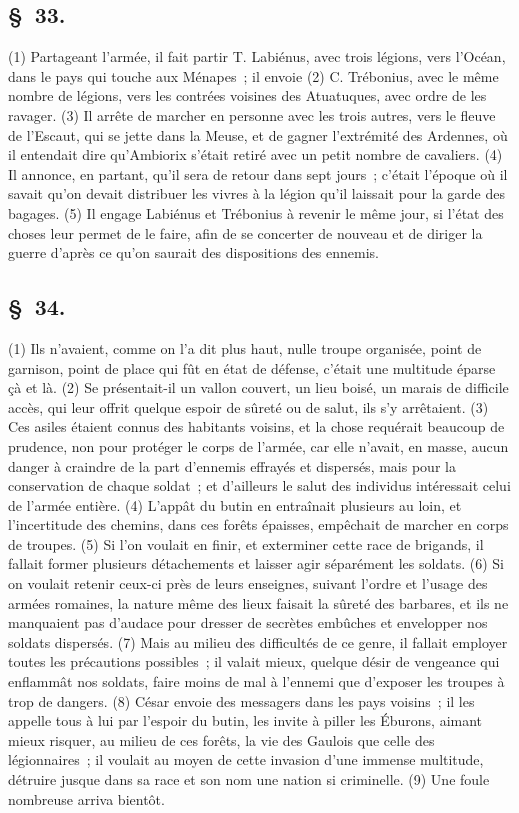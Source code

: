 \documentclass[french,twoside]{book} %
\begin{document}
\subsection[{§ 33.}]{ \textsc{§ 33.} }
\noindent (1) Partageant l’armée, il fait partir T. Labiénus, avec trois légions, vers l’Océan, dans le pays qui touche aux Ménapes ; il envoie (2) C. Trébonius, avec le même nombre de légions, vers les contrées voisines des Atuatuques, avec ordre de les ravager. (3) Il arrête de marcher en personne avec les trois autres, vers le fleuve de l’Escaut, qui se jette dans la Meuse, et de gagner l’extrémité des Ardennes, où il entendait dire qu’Ambiorix s’était retiré avec un petit nombre de cavaliers. (4) Il annonce, en partant, qu’il sera de retour dans sept jours ; c’était l’époque où il savait qu’on devait distribuer les vivres à la légion qu’il laissait pour la garde des bagages. (5) Il engage Labiénus et Trébonius à revenir le même jour, si l’état des choses leur permet de le faire, afin de se concerter de nouveau et de diriger la guerre d’après ce qu’on saurait des dispositions des ennemis.
\subsection[{§ 34.}]{ \textsc{§ 34.} }
\noindent (1) Ils n’avaient, comme on l’a dit plus haut, nulle troupe organisée, point de garnison, point de place qui fût en état de défense, c’était une multitude éparse çà et là. (2) Se présentait-il un vallon couvert, un lieu boisé, un marais de difficile accès, qui leur offrit quelque espoir de sûreté ou de salut, ils s’y arrêtaient. (3) Ces asiles étaient connus des habitants voisins, et la chose requérait beaucoup de prudence, non pour protéger le corps de l’armée, car elle n’avait, en masse, aucun danger à craindre de la part d’ennemis effrayés et dispersés, mais pour la conservation de chaque soldat ; et d’ailleurs le salut des individus intéressait celui de l’armée entière. (4) L'appât du butin en entraînait plusieurs au loin, et l’incertitude des chemins, dans ces forêts épaisses, empêchait de marcher en corps de troupes. (5) Si l’on voulait en finir, et exterminer cette race de brigands, il fallait former plusieurs détachements et laisser agir séparément les soldats. (6) Si on voulait retenir ceux-ci près de leurs enseignes, suivant l’ordre et l’usage des armées romaines, la nature même des lieux faisait la sûreté des barbares, et ils ne manquaient pas d’audace pour dresser de secrètes embûches et envelopper nos soldats dispersés. (7) Mais au milieu des difficultés de ce genre, il fallait employer toutes les précautions possibles ; il valait mieux, quelque désir de vengeance qui enflammât nos soldats, faire moins de mal à l’ennemi que d’exposer les troupes à trop de dangers. (8) César envoie des messagers dans les pays voisins ; il les appelle tous à lui par l’espoir du butin, les invite à piller les Éburons, aimant mieux risquer, au milieu de ces forêts, la vie des Gaulois que celle des légionnaires ; il voulait au moyen de cette invasion d’une immense multitude, détruire jusque dans sa race et son nom une nation si criminelle. (9) Une foule nombreuse arriva bientôt.
\end{document}
